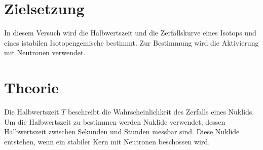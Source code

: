 \section{Zielsetzung}
In diesem Versuch wird die Halbwertszeit und die Zerfallskurve eines Isotops und eines istabilen Isotopengemische bestimmt.
Zur Bestimmung wird die Aktivierung mit Neutronen verwendet.
\section{Theorie}
\label{sec:Theorie}
Die Halbwertszeit $T$ beschreibt die Wahrscheinlichkeit des Zerfalls eines Nuklids.
Um die Halbwertszeit zu bestimmen werden Nuklide verwendet, dessen Halbwertszeit zwischen Sekunden und Stunden messbar sind.
Diese Nuklide entstehen, wenn ein stabiler Kern mit Neutronen beschossen wird.

